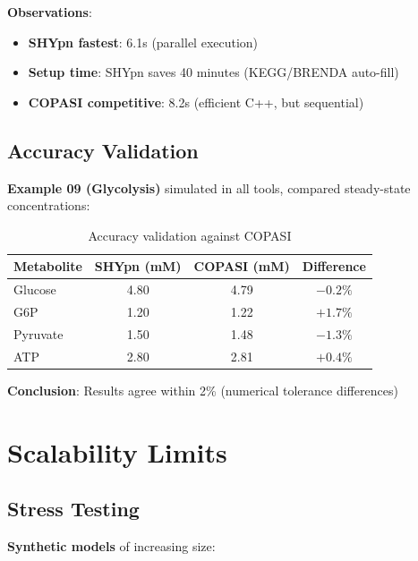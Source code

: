 \textbf{Observations}:

\begin{itemize}
    \item \textbf{SHYpn fastest}: 6.1s (parallel execution)
    \item \textbf{Setup time}: SHYpn saves 40 minutes (KEGG/BRENDA auto-fill)
    \item \textbf{COPASI competitive}: 8.2s (efficient C++, but sequential)
\end{itemize}

\subsection{Accuracy Validation}
\label{subsec:accuracy-validation}

\textbf{Example 09 (Glycolysis)} simulated in all tools, compared steady-state concentrations:

\begin{table}[h]
\centering
\begin{tabular}{@{}lccc@{}}
\toprule
\textbf{Metabolite} & \textbf{SHYpn (mM)} & \textbf{COPASI (mM)} & \textbf{Difference} \\
\midrule
Glucose & 4.80 & 4.79 & $-0.2\%$ \\
G6P & 1.20 & 1.22 & $+1.7\%$ \\
Pyruvate & 1.50 & 1.48 & $-1.3\%$ \\
ATP & 2.80 & 2.81 & $+0.4\%$ \\
\bottomrule
\end{tabular}
\caption{Accuracy validation against COPASI}
\label{tab:accuracy-validation}
\end{table}

\textbf{Conclusion}: Results agree within 2\% (numerical tolerance differences) \checkmark

\section{Scalability Limits}
\label{sec:scalability-limits}

\subsection{Stress Testing}
\label{subsec:stress-testing}

\textbf{Synthetic models} of increasing size:

